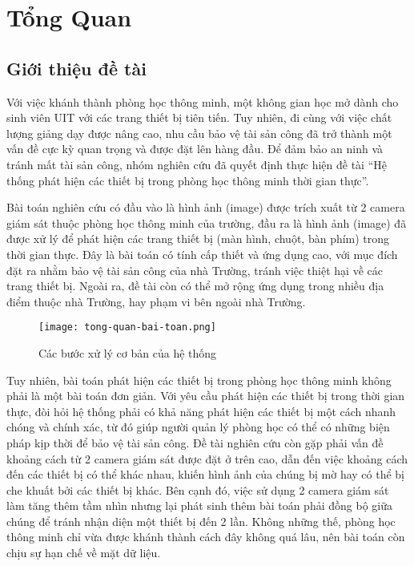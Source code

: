
\chapter{Tổng Quan}
\ifpdf
    \graphicspath{{Chapter1/Chapter1Figs/PNG/}{Chapter1/Chapter1Figs/PDF/}{Chapter1/Chapter1Figs/}}
\else
    \graphicspath{{Chapter1/Chapter1Figs/EPS/}{Chapter1/Chapter1Figs/}}
\fi

\section{Giới thiệu đề tài}
Với việc khánh thành phòng học thông minh, một không gian học mở dành cho sinh viên UIT với các trang thiết bị tiên tiến. Tuy nhiên, đi cùng với việc chất lượng giảng dạy được nâng cao, nhu cầu bảo vệ tài sản công đã trở thành một vấn đề cực kỳ quan trọng và được đặt lên hàng đầu. Để đảm bảo an ninh và tránh mất tài sản công, nhóm nghiên cứu đã quyết định thực hiện đề tài “Hệ thống phát hiện các thiết bị trong phòng học thông minh thời gian thực”. 

Bài toán nghiên cứu có đầu vào là hình ảnh (image) được trích xuất từ 2 camera giám sát thuộc phòng học thông minh của trường, đầu ra là hình ảnh (image) đã được xử lý để phát hiện các trang thiết bị (màn hình, chuột, bàn phím) trong thời gian thực. Đây là bài toán có tính cấp thiết và ứng dụng cao, với mục đích đặt ra nhằm bảo vệ tài sản công của nhà Trường, tránh việc thiệt hại về các trang thiết bị. Ngoài ra, đề tài còn có thể mở rộng ứng dụng trong nhiều địa điểm thuộc nhà Trường, hay phạm vi bên ngoài nhà Trường. 

\begin{figure}[h!]
	\texttt{[image: tong-quan-bai-toan.png]}
	\caption{Các bước xử lý cơ bản của hệ thống}
\end{figure}

	Tuy nhiên, bài toán phát hiện các thiết bị trong phòng học thông minh không phải là một bài toán đơn giản. Với yêu cầu phát hiện các thiết bị trong thời gian thực, đòi hỏi hệ thống phải có khả năng phát hiện các thiết bị một cách nhanh chóng và chính xác, từ đó giúp người quản lý phòng học có thể có những biện pháp kịp thời để bảo vệ tài sản công. Đề tài nghiên cứu còn gặp phải vấn đề khoảng cách từ 2 camera giám sát được đặt ở trên cao, dẫn đến việc khoảng cách đến các thiết bị có thể khác nhau, khiến hình ảnh của chúng bị mờ hay có thể bị che khuất bởi các thiết bị khác. Bên cạnh đó, việc sử dụng 2 camera giám sát làm tăng thêm tầm nhìn nhưng lại phát sinh thêm bài toán phải đồng bộ giữa chúng để tránh nhận diện một thiết bị đến 2 lần. Không những thế, phòng học thông minh chỉ vừa được khánh thành cách đây không quá lâu, nên bài toán còn chịu sự hạn chế về mặt dữ liệu.   
	
